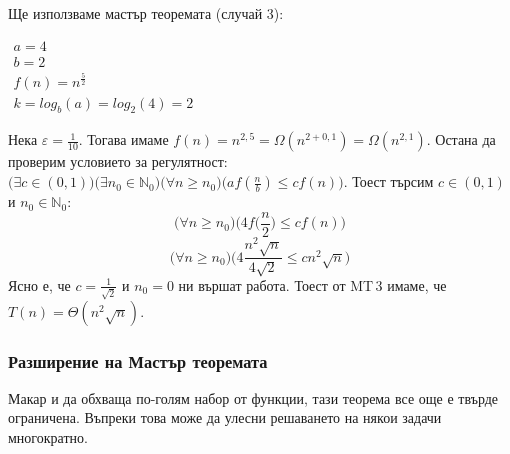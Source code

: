 \begin{solution}
	Ще използваме $\hyperref[th:master-theorem]{\text{мастър теоремата}}$ (случай 3):
	\begin{center}
		$\begin{array}{|l}
			a=4\\
			b=2\\
			f(n)=n^{\frac52}\\
			k=log_b(a)=log_2(4)=2
		\end{array}$
	\end{center}
	Нека $\varepsilon=\frac1{10}$. Тогава имаме $f(n)\!=\!n^{2,5}\!=\!\Omega(n^{2+0,1})\!=\!\Omega(n^{2,1})$. Остана да проверим условието за регулятност: $\big(\exists c\!\in\!(0,1)\big)\big(\exists n_0\!\in\!\mathbb{N}_0\big)\big(\forall n\!\ge\! n_0\big)\big(af(\frac nb)\!\le\! cf(n)\big)$. Тоест търсим $c\!\in\!(0,1)$ и $n_0\!\in\!\mathbb{N}_0$:
	\begin{equation*}
		\big(\forall n\ge n_0\big)\bigg(4f\Big(\frac n2\Big)\le cf(n)\bigg)
	\end{equation*}
	\begin{equation*}
		\big(\forall n\ge n_0\big)\bigg(4\frac {n^2\sqrt n}{4\sqrt2}\le cn^2\sqrt n\bigg)
	\end{equation*}
	Ясно е, че $c=\frac1{\sqrt2}$ и $n_0=0$ ни вършат работа. Тоест от MT\,3 имаме, че $T(n)=\Theta(n^2\sqrt n)$.
\end{solution}\leavevmode\newline

\subsubsection{Разширение на Мастър теоремата}
Макар и да обхваща по-голям набор от функции, тази теорема все още е твърде ограничена. Въпреки това може да улесни решаването на някои задачи многократно.

